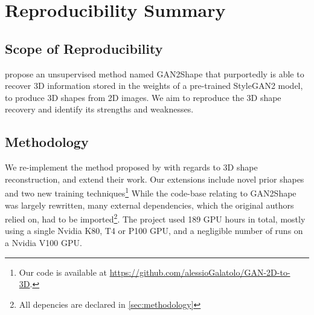 \section*{\centering Reproducibility Summary}


\subsection*{Scope of Reproducibility}


\cite{gan2shape} propose an unsupervised method named GAN2Shape that purportedly is able to recover 3D information stored in the weights of a pre-trained StyleGAN2 model, to produce 3D shapes from 2D images. We aim to reproduce the 3D shape recovery and identify its strengths and weaknesses.

\subsection*{Methodology}


We re-implement the method proposed by \cite{gan2shape} with regards to 3D shape reconstruction, and extend their work. Our extensions include novel prior shapes and two new training techniques\footnote{Our code is available at \url{https://github.com/alessioGalatolo/GAN-2D-to-3D}.} While the code-base relating to GAN2Shape was largely rewritten, many external dependencies, which the original authors relied on, had to be imported\footnote{All depencies are declared in \autoref{sec:methodology}}. The project used 189 GPU hours in total, mostly using a single Nvidia K80, T4 or P100 GPU, and a negligible number of runs on a Nvidia V100 GPU.

